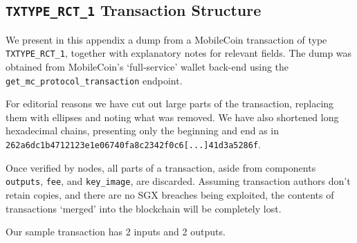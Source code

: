 \begin{appendices}

\renewcommand{\theFancyVerbLine}{%
	\textcolor{red}{\small
		\arabic{FancyVerbLine}}}

\chapter{{\tt TXTYPE\_RCT\_1} Transaction Structure}
\label{appendix:TXTYPE_RCT_1}

We present in this appendix a dump from a MobileCoin transaction of type {\tt TXTYPE\_RCT\_1}, 
together with explanatory notes for relevant fields. The dump was obtained from MobileCoin's `full-service' wallet back-end \cite{mobilecoin-full-service-source-code} using the {\tt get\_mc\_protocol\_transaction} endpoint.

For editorial reasons we have cut out large parts of the transaction, replacing them with ellipses and noting what was removed. We have also shortened long hexadecimal chains, presenting only the beginning and end as in {\tt 262a6dc1b4712123e1e06740fa8c2342f0c6[...]41d3a5286f}.

Once verified by nodes, all parts of a transaction, aside from components {\tt outputs}, {\tt fee}, and {\tt key\_image}, are discarded. Assuming transaction authors don't retain copies, and there are no SGX breaches being exploited, the contents of transactions `merged' into the blockchain will be completely lost.

Our sample transaction has 2 inputs and 2 outputs.


\end{appendices}
